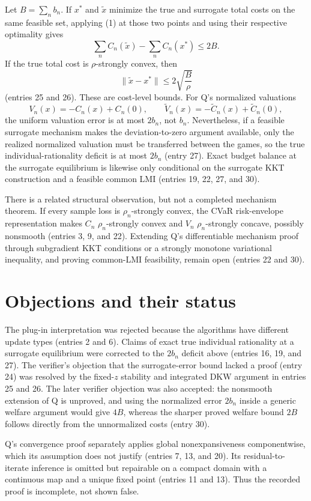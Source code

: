 \documentclass{article}
\begin{document}
Let $B=\sum_n b_n$. If $x^*$ and $\widetilde x$ minimize the true and surrogate total costs on the same feasible set, applying (1) at those two points and using their respective optimality gives
\[
\sum_n C_n(\widetilde x)-\sum_n C_n(x^*)\leq 2B.
\]
If the true total cost is $\rho$-strongly convex, then
\[
\|\widetilde x-x^*\|\leq 2\sqrt{\frac{B}{\rho}}
\]
(entries 25 and 26). These are cost-level bounds. For Q's normalized valuations
\[
V_n(x)=-C_n(x)+C_n(0),\qquad
\widetilde V_n(x)=-\widetilde C_n(x)+\widetilde C_n(0),
\]
the uniform valuation error is at most $2b_n$, not $b_n$. Nevertheless, if a feasible surrogate mechanism makes the deviation-to-zero argument available, only the realized normalized valuation must be transferred between the games, so the true individual-rationality deficit is at most $2b_n$ (entry 27). Exact budget balance at the surrogate equilibrium is likewise only conditional on the surrogate KKT construction and a feasible common LMI (entries 19, 22, 27, and 30).

There is a related structural observation, but not a completed mechanism theorem. If every sample loss is $\rho_n$-strongly convex, the CVaR risk-envelope representation makes $C_n$ $\rho_n$-strongly convex and $V_n$ $\rho_n$-strongly concave, possibly nonsmooth (entries 3, 9, and 22). Extending Q's differentiable mechanism proof through subgradient KKT conditions or a strongly monotone variational inequality, and proving common-LMI feasibility, remain open (entries 22 and 30).

\section*{Objections and their status}
The plug-in interpretation was rejected because the algorithms have different update types (entries 2 and 6). Claims of exact true individual rationality at a surrogate equilibrium were corrected to the $2b_n$ deficit above (entries 16, 19, and 27). The verifier's objection that the surrogate-error bound lacked a proof (entry 24) was resolved by the fixed-$z$ stability and integrated DKW argument in entries 25 and 26. The later verifier objection was also accepted: the nonsmooth extension of Q is unproved, and using the normalized error $2b_n$ inside a generic welfare argument would give $4B$, whereas the sharper proved welfare bound $2B$ follows directly from the unnormalized costs (entry 30).

Q's convergence proof separately applies global nonexpansiveness componentwise, which its assumption does not justify (entries 7, 13, and 20). Its residual-to-iterate inference is omitted but repairable on a compact domain with a continuous map and a unique fixed point (entries 11 and 13). Thus the recorded proof is incomplete, not shown false.
\end{document}
